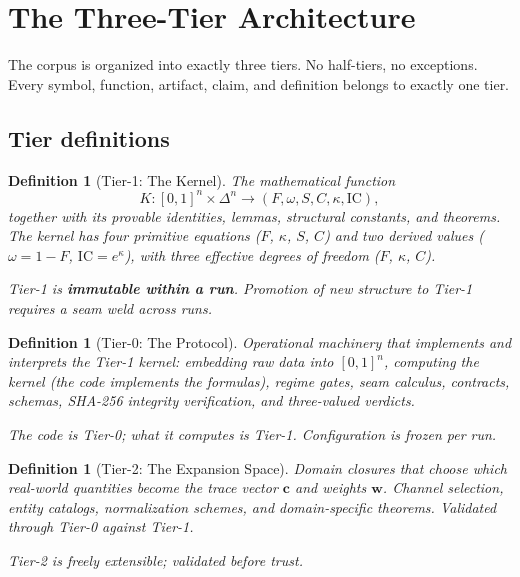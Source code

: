 \documentclass[
  aps,
  prd,
  twocolumn,
  superscriptaddress,
  nofootinbib,
  floatfix
]{revtex4-2}
\newtheorem{definition}[theorem]{Definition}
\newcommand{\beq}{\begin{equation}}
\newcommand{\eeq}{\end{equation}}
\newcommand{\tvec}{\mathbf{c}}
\newcommand{\wvec}{\mathbf{w}}
\newcommand{\IC}{\mathrm{IC}}
\begin{document}
\section{The Three-Tier Architecture}\label{sec:tiers}

The corpus is organized into exactly three tiers.  No half-tiers,
no exceptions.  Every symbol, function, artifact, claim, and
definition belongs to exactly one tier.

\subsection{Tier definitions}

\begin{definition}[Tier-1: The Kernel]
\label{def:tier1}
The mathematical function
\beq
  K: [0,1]^n \times \Delta^n \to (F, \omega, S, C, \kappa, \IC),
\eeq
together with its provable identities, lemmas, structural constants,
and theorems.  The kernel has four primitive equations ($F$, $\kappa$,
$S$, $C$) and two derived values ($\omega = 1 - F$, $\IC = e^\kappa$),
with three effective degrees of freedom ($F$, $\kappa$, $C$).

Tier-1 is \textbf{immutable within a run}.  Promotion of new
structure to Tier-1 requires a seam weld across runs.
\end{definition}

\begin{definition}[Tier-0: The Protocol]
\label{def:tier0}
Operational machinery that \emph{implements and interprets} the
Tier-1 kernel: embedding raw data into $[0,1]^n$, computing the
kernel (the code implements the formulas), regime gates, seam
calculus, contracts, schemas, SHA-256 integrity verification,
and three-valued verdicts.

The code is Tier-0; \emph{what it computes} is Tier-1.
Configuration is frozen per run.
\end{definition}

\begin{definition}[Tier-2: The Expansion Space]
\label{def:tier2}
Domain closures that choose which real-world quantities become the
trace vector $\tvec$ and weights $\wvec$.  Channel selection, entity
catalogs, normalization schemes, and domain-specific theorems.
Validated through Tier-0 against Tier-1.

Tier-2 is freely extensible; validated before trust.
\end{definition}
\end{document}
